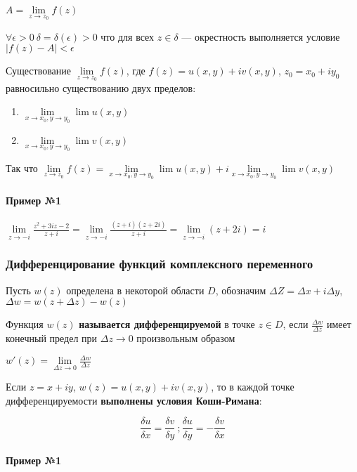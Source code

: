\documentclass{article}
\begin{document}
$A = \lim\limits_{z \to z_0} f(z)$

$\forall \epsilon > 0 \ \delta = \delta (\epsilon) > 0$ что для всех $z \in \delta$ — окрестность выполняется условие $| f(z) - A| < \epsilon$

\hfill

Существование $\lim\limits_{z \to z_0} f(z)$, где $f(z) = u(x, y) + i v(x, y)$, $z_0 = x_0 + i y_0$ равносильно существованию двух пределов:
\begin{enumerate}
    \item $\lim\limits_{x \to x_0, y \to y_0} \lim u(x, y)$
    \item $\lim\limits_{x \to x_0, y \to y_0} \lim v(x, y)$
\end{enumerate}

Так что $\lim\limits_{z \to z_0} f(z) = \lim\limits_{x \to x_0, y \to y_0} \lim u(x, y) + i \lim\limits_{x \to x_0, y \to y_0} \lim v(x, y)$

\paragraph{Пример №1}

$\lim\limits_{z \to -i} \frac{z^2 + 3 i z - 2}{z + i} = \lim\limits_{z \to -i} \frac{(z + i)(z + 2 i)}{z + i} = \lim\limits_{z \to -i} (z + 2 i) = i$

\subsubsection{Дифференцирование функций комплексного переменного}

Пусть $w (z)$ определена в некоторой области $D$, обозначим $\Delta Z = \Delta x + i \Delta y$, $\Delta w = w (z + \Delta z) - w (z)$

Функция $w(z)$ \textbf{называется дифференцируемой} в точке $z \in D$, если $\frac{\Delta w}{\Delta z}$ имеет конечный предел при $\Delta z \to 0$ произвольным образом

$w' (z) = \lim\limits_{\Delta z \to 0} \frac{\Delta w}{\Delta z}$

\hfill

Если $z = x + i y$, $w(z) = u(x, y) + i v (x, y)$, то в каждой точке дифференцируемости \textbf{выполнены условия Коши-Римана}:

$$
\frac{\delta u}{\delta x} = \frac{\delta v}{\delta y} \ ; \frac{\delta u}{\delta y} = - \frac{\delta v}{\delta x}
$$

\paragraph{Пример №1}
\end{document}
